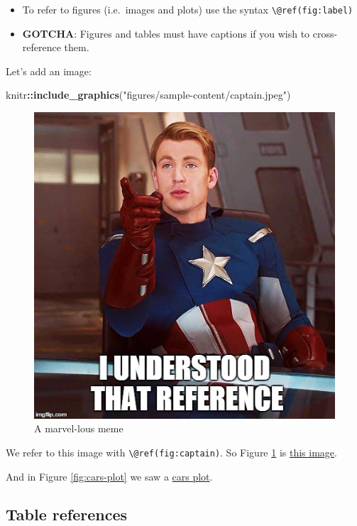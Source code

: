 \documentclass[a4paper, twoside]{templates/ociamthesis}
\providecommand{\tightlist}{%
  \setlength{\itemsep}{0pt}\setlength{\parskip}{0pt}}
\newenvironment{Shaded}{\begin{snugshade}}{\end{snugshade}}
\newcommand{\KeywordTok}[1]{\textcolor[rgb]{0.13,0.29,0.53}{\textbf{#1}}}
\newcommand{\NormalTok}[1]{#1}
\newcommand{\OperatorTok}[1]{\textcolor[rgb]{0.81,0.36,0.00}{\textbf{#1}}}
\newcommand{\StringTok}[1]{\textcolor[rgb]{0.31,0.60,0.02}{#1}}
\renewenvironment{Shaded}
{
  \vspace{10pt}%
  \begin{snugshade}%
}{%
  \end{snugshade}%
  \vspace{8pt}%
}
\theoremstyle{definition}
\theoremstyle{definition}
\theoremstyle{definition}
\theoremstyle{definition}
\theoremstyle{remark}
\begin{document}
\begin{itemize}
\tightlist
\item
  To refer to figures (i.e.~images and plots) use the syntax \texttt{\textbackslash{}@ref(fig:label)}
\item
  \textbf{GOTCHA}: Figures and tables must have captions if you wish to cross-reference them.
\end{itemize}

Let's add an image:

\begin{Shaded}
\begin{Highlighting}[]
\NormalTok{knitr}\OperatorTok{::}\KeywordTok{include\_graphics}\NormalTok{(}\StringTok{"figures/sample{-}content/captain.jpeg"}\NormalTok{)}
\end{Highlighting}
\end{Shaded}

\begin{figure}

{\centering \includegraphics[width=0.65\linewidth]{figures/sample-content/captain} 

}

\caption{A marvel-lous meme}\label{fig:captain}
\end{figure}

We refer to this image with \texttt{\textbackslash{}@ref(fig:captain)}.
So Figure \ref{fig:captain} is \protect\hyperlink{fig:captain}{this image}.

And in Figure \ref{fig:cars-plot} we saw a \protect\hyperlink{fig:cars-plot}{cars plot}.

\hypertarget{table-references}{%
\subsection{Table references}\label{table-references}}
\end{document}

